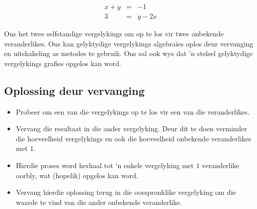 \begin{equation*}
\begin{array}{rcl} x+y&=&-1 \\ 
 3&=&y-2x 
\end{array}
\end{equation*}

Ons het twee selfstandige vergelykings om op te los vir twee onbekende veranderlikes. Ons kan gelyktydige vergelykings algebraïes oplos deur vervanging en uitskakeling as metodes te gebruik. Ons sal ook wys dat 'n stelsel gelyktydige vergelykings grafies opgelos kan word.\par

\par 
      


\subsection*{Oplossing deur vervanging}
\begin{itemize}
 \item Probeer om een van die vergelykings op te los vir een van die veranderlikes.
\item Vervang die resultaat in die ander vergelyking. Deur dit te doen verminder die hoeveelheid
vergelykings en ook die hoeveelheid onbekende veranderlikes met $1$.
\item Hierdie proses word herhaal tot ‘n enkele vergelyking met $1$ veranderlike oorbly, wat (hopelik) opgelos kan word.
\item Vervang hierdie oplossing terug in die oorspronklike vergelyking om die waarde te vind van die ander onbekende veranderlike.
\end{itemize}

